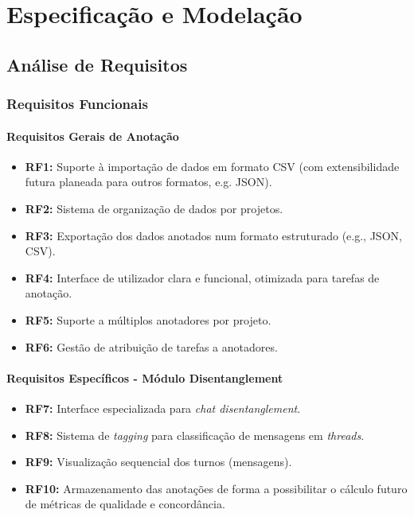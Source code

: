 \chapter{Especificação e Modelação}

\section{Análise de Requisitos}

\subsection{Requisitos Funcionais}

\subsubsection{Requisitos Gerais de Anotação}

\begin{itemize}
    \item \textbf{RF1:} Suporte à importação de dados em formato CSV (com extensibilidade futura planeada para outros formatos, e.g. JSON).
    \item \textbf{RF2:} Sistema de organização de dados por projetos.
    \item \textbf{RF3:} Exportação dos dados anotados num formato estruturado (e.g., JSON, CSV).
    \item \textbf{RF4:} Interface de utilizador clara e funcional, otimizada para tarefas de anotação.
    \item \textbf{RF5:} Suporte a múltiplos anotadores por projeto.
    \item \textbf{RF6:} Gestão de atribuição de tarefas a anotadores.
\end{itemize}

\subsubsection{Requisitos Específicos - Módulo Disentanglement}

\begin{itemize}
    \item \textbf{RF7:} Interface especializada para \textit{chat disentanglement}.
    \item \textbf{RF8:} Sistema de \textit{tagging} para classificação de mensagens em \textit{threads}.
    \item \textbf{RF9:} Visualização sequencial dos turnos (mensagens).
    \item \textbf{RF10:} Armazenamento das anotações de forma a possibilitar o cálculo futuro de métricas de qualidade e concordância.
\end{itemize}

